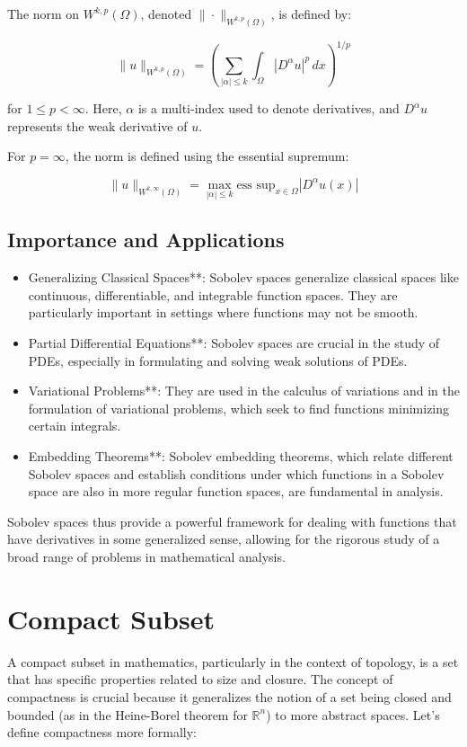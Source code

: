 \documentclass[a4paper,12pt]{article} %
\begin{document}
The norm on $W^{k,p}(\Omega)$, denoted $\|\cdot\|_{W^{k,p}(\Omega)}$, is defined by:

\[
\|u\|_{W^{k,p}(\Omega)} = {\left( \sum_{|\alpha| \leq k} \int_{\Omega} |D^{\alpha} u|^p \, dx \right)}^{1/p}
\]

for $1 \leq p < \infty$. Here, $\alpha$ is a multi-index used to denote derivatives, and $D^{\alpha} u$ represents the weak derivative of $u$.

For $p = \infty$, the norm is defined using the essential supremum:

\[
\|u\|_{W^{k,\infty}(\Omega)} = \max_{|\alpha| \leq k} \text{ess sup}_{x \in \Omega} |D^{\alpha} u(x)|
\]

\subsection{Importance and Applications}
\begin{itemize}

   \item Generalizing Classical Spaces**: Sobolev spaces generalize classical spaces like continuous, differentiable, and integrable function spaces. They are particularly important in settings where functions may not be smooth.
  
   \item Partial Differential Equations**: Sobolev spaces are crucial in the study of PDEs, especially in formulating and solving weak solutions of PDEs.
  
   \item Variational Problems**: They are used in the calculus of variations and in the formulation of variational problems, which seek to find functions minimizing certain integrals.

   \item Embedding Theorems**: Sobolev embedding theorems, which relate different Sobolev spaces and establish conditions under which functions in a Sobolev space are also in more regular function spaces, are fundamental in analysis.

\end{itemize}
   Sobolev spaces thus provide a powerful framework for dealing with functions that have derivatives in some generalized sense, allowing for the rigorous study of a broad range of problems in mathematical analysis.

\newpage
\section{\textbf{Compact Subset}}
A compact subset in mathematics, particularly in the context of topology, is a set that has specific properties related to size and closure. The concept of compactness is crucial because it generalizes the notion of a set being closed and bounded (as in the Heine-Borel theorem for \(\mathbb{R}^n\)) to more abstract spaces. Let's define compactness more formally:
\end{document}
